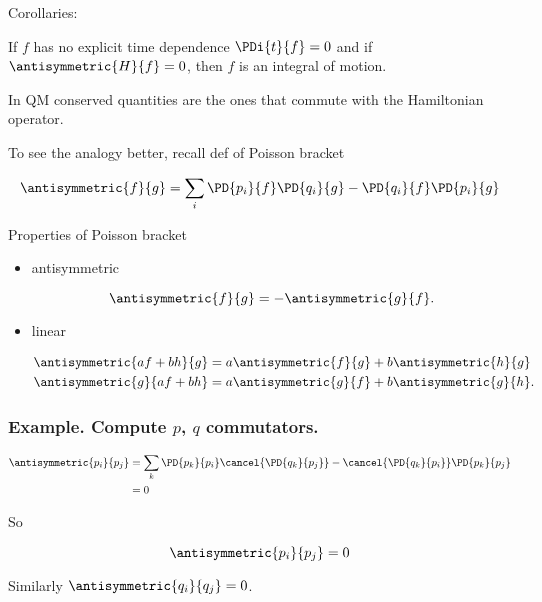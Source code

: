Corollaries:

If $f$ has no explicit time dependence $\PDi{t}{f} = 0$ and if $\antisymmetric{H}{f} = 0$, then $f$ is an integral of motion.

In QM conserved quantities are the ones that commute with the Hamiltonian operator.

To see the analogy better, recall def of Poisson bracket

\begin{equation}\label{eqn:phaseSpaceAndTrajectories:110}
\antisymmetric{f}{g} =
\sum_i
\PD{p_i}{f}
\PD{q_i}{g}
-
\PD{q_i}{f}
\PD{p_i}{g}
\end{equation}

Properties of Poisson bracket

\begin{itemize}
\item antisymmetric

\begin{equation}\label{eqn:phaseSpaceAndTrajectories:130}
\antisymmetric{f}{g} = -\antisymmetric{g}{f}.
\end{equation}

\item linear

\begin{align}\label{eqn:phaseSpaceAndTrajectories:150}
\antisymmetric{a f + b h}{g} &= a \antisymmetric{f}{g} + b\antisymmetric{h}{g} \\
\antisymmetric{g}{a f + b h} &= a \antisymmetric{g}{f} + b\antisymmetric{g}{h}.
\end{align}
\end{itemize}

\subsubsection{Example.  Compute $p$, $q$ commutators.}

\begin{align*}
\antisymmetric{p_i}{p_j} 
&= 
\sum_k
\PD{p_k}{p_i}
\cancel{
\PD{q_k}{p_j}
}
-
\cancel{
\PD{q_k}{p_i}
}
\PD{p_k}{p_j} \\
&= 0
\end{align*}

So 

\begin{equation}\label{eqn:phaseSpaceAndTrajectories:170}
\antisymmetric{p_i}{p_j} = 0
\end{equation}

Similarly $\antisymmetric{q_i}{q_j} = 0$.

